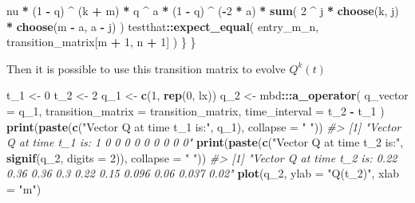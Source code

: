 \documentclass[]{article}
\newenvironment{Shaded}{\begin{snugshade}}{\end{snugshade}}
\newcommand{\CommentTok}[1]{\textcolor[rgb]{0.56,0.35,0.01}{\textit{#1}}}
\newcommand{\DataTypeTok}[1]{\textcolor[rgb]{0.13,0.29,0.53}{#1}}
\newcommand{\DecValTok}[1]{\textcolor[rgb]{0.00,0.00,0.81}{#1}}
\newcommand{\KeywordTok}[1]{\textcolor[rgb]{0.13,0.29,0.53}{\textbf{#1}}}
\newcommand{\NormalTok}[1]{#1}
\newcommand{\OperatorTok}[1]{\textcolor[rgb]{0.81,0.36,0.00}{\textbf{#1}}}
\newcommand{\StringTok}[1]{\textcolor[rgb]{0.31,0.60,0.02}{#1}}
\begin{document}
\begin{Shaded}
\begin{Highlighting}[]
\StringTok{      }\NormalTok{nu }\OperatorTok{*}
\StringTok{      }\NormalTok{(}\DecValTok{1} \OperatorTok{-}\StringTok{ }\NormalTok{q) }\OperatorTok{^}\StringTok{ }\NormalTok{(k }\OperatorTok{+}\StringTok{ }\NormalTok{m) }\OperatorTok{*}
\StringTok{      }\NormalTok{q }\OperatorTok{^}\StringTok{ }\NormalTok{a }\OperatorTok{*}\StringTok{ }
\StringTok{      }\NormalTok{(}\DecValTok{1} \OperatorTok{-}\StringTok{ }\NormalTok{q) }\OperatorTok{^}\StringTok{ }\NormalTok{(}\OperatorTok{-}\DecValTok{2} \OperatorTok{*}\StringTok{ }\NormalTok{a) }\OperatorTok{*}
\StringTok{      }\KeywordTok{sum}\NormalTok{(}
        \DecValTok{2} \OperatorTok{^}\StringTok{ }\NormalTok{j }\OperatorTok{*}\StringTok{ }\KeywordTok{choose}\NormalTok{(k, j) }\OperatorTok{*}\StringTok{ }\KeywordTok{choose}\NormalTok{(m }\OperatorTok{-}\StringTok{ }\NormalTok{a, a }\OperatorTok{-}\StringTok{ }\NormalTok{j)}
\NormalTok{      )}
\NormalTok{    testthat}\OperatorTok{::}\KeywordTok{expect_equal}\NormalTok{(}
\NormalTok{      entry_m_n,}
\NormalTok{      transition_matrix[m }\OperatorTok{+}\StringTok{ }\DecValTok{1}\NormalTok{, n }\OperatorTok{+}\StringTok{ }\DecValTok{1}\NormalTok{]}
\NormalTok{    )}
\NormalTok{  \}}
\NormalTok{\}}
\end{Highlighting}
\end{Shaded}

Then it is possible to use this transition matrix to evolve \(Q^k(t)\)

\begin{Shaded}
\begin{Highlighting}[]
\NormalTok{t_}\DecValTok{1}\NormalTok{ <-}\StringTok{ }\DecValTok{0}
\NormalTok{t_}\DecValTok{2}\NormalTok{ <-}\StringTok{ }\DecValTok{2}
\NormalTok{q_}\DecValTok{1}\NormalTok{ <-}\StringTok{ }\KeywordTok{c}\NormalTok{(}\DecValTok{1}\NormalTok{, }\KeywordTok{rep}\NormalTok{(}\DecValTok{0}\NormalTok{, lx))}
\NormalTok{q_}\DecValTok{2}\NormalTok{ <-}\StringTok{ }\NormalTok{mbd}\OperatorTok{:::}\KeywordTok{a_operator}\NormalTok{(}
  \DataTypeTok{q_vector =}\NormalTok{ q_}\DecValTok{1}\NormalTok{,}
  \DataTypeTok{transition_matrix =}\NormalTok{ transition_matrix,}
  \DataTypeTok{time_interval =}\NormalTok{ t_}\DecValTok{2} \OperatorTok{-}\StringTok{ }\NormalTok{t_}\DecValTok{1}
\NormalTok{)}
\KeywordTok{print}\NormalTok{(}\KeywordTok{paste}\NormalTok{(}\KeywordTok{c}\NormalTok{(}\StringTok{"Vector Q at time t_1 is:"}\NormalTok{, q_}\DecValTok{1}\NormalTok{), }\DataTypeTok{collapse =} \StringTok{" "}\NormalTok{))}
\CommentTok{#> [1] "Vector Q at time t_1 is: 1 0 0 0 0 0 0 0 0 0"}
\KeywordTok{print}\NormalTok{(}\KeywordTok{paste}\NormalTok{(}\KeywordTok{c}\NormalTok{(}\StringTok{"Vector Q at time t_2 is:"}\NormalTok{, }\KeywordTok{signif}\NormalTok{(q_}\DecValTok{2}\NormalTok{, }\DataTypeTok{digits =} \DecValTok{2}\NormalTok{)), }\DataTypeTok{collapse =} \StringTok{" "}\NormalTok{))}
\CommentTok{#> [1] "Vector Q at time t_2 is: 0.22 0.36 0.36 0.3 0.22 0.15 0.096 0.06 0.037 0.02"}
\KeywordTok{plot}\NormalTok{(q_}\DecValTok{2}\NormalTok{, }\DataTypeTok{ylab =} \StringTok{"Q(t_2)"}\NormalTok{, }\DataTypeTok{xlab =} \StringTok{"m"}\NormalTok{)}
\end{Highlighting}
\end{Shaded}
\end{document}

